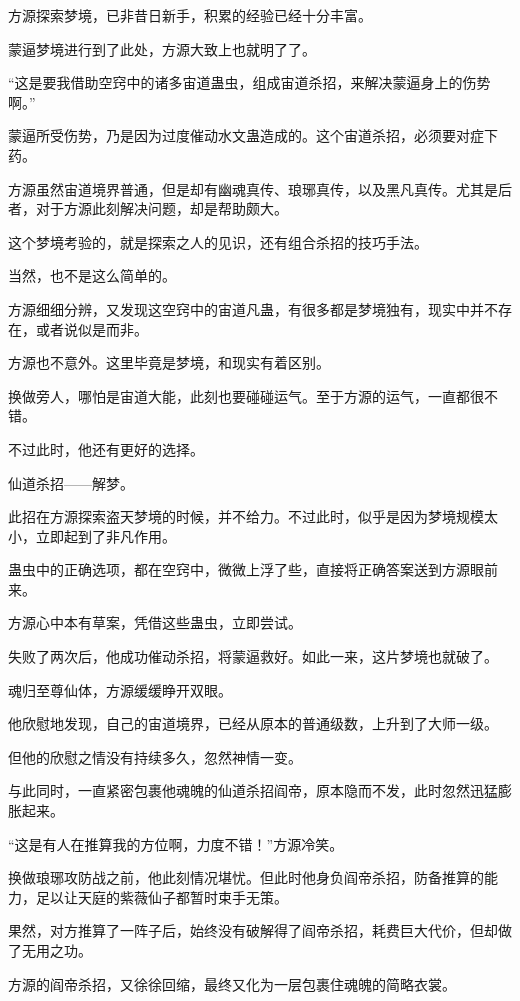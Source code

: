 
\begin{this_body}

方源探索梦境，已非昔日新手，积累的经验已经十分丰富。

蒙逼梦境进行到了此处，方源大致上也就明了了。

“这是要我借助空窍中的诸多宙道蛊虫，组成宙道杀招，来解决蒙逼身上的伤势啊。”

蒙逼所受伤势，乃是因为过度催动水文蛊造成的。这个宙道杀招，必须要对症下药。

方源虽然宙道境界普通，但是却有幽魂真传、琅琊真传，以及黑凡真传。尤其是后者，对于方源此刻解决问题，却是帮助颇大。

这个梦境考验的，就是探索之人的见识，还有组合杀招的技巧手法。

当然，也不是这么简单的。

方源细细分辨，又发现这空窍中的宙道凡蛊，有很多都是梦境独有，现实中并不存在，或者说似是而非。

方源也不意外。这里毕竟是梦境，和现实有着区别。

换做旁人，哪怕是宙道大能，此刻也要碰碰运气。至于方源的运气，一直都很不错。

不过此时，他还有更好的选择。

仙道杀招——解梦。

此招在方源探索盗天梦境的时候，并不给力。不过此时，似乎是因为梦境规模太小，立即起到了非凡作用。

蛊虫中的正确选项，都在空窍中，微微上浮了些，直接将正确答案送到方源眼前来。

方源心中本有草案，凭借这些蛊虫，立即尝试。

失败了两次后，他成功催动杀招，将蒙逼救好。如此一来，这片梦境也就破了。

魂归至尊仙体，方源缓缓睁开双眼。

他欣慰地发现，自己的宙道境界，已经从原本的普通级数，上升到了大师一级。

但他的欣慰之情没有持续多久，忽然神情一变。

与此同时，一直紧密包裹他魂魄的仙道杀招阎帝，原本隐而不发，此时忽然迅猛膨胀起来。

“这是有人在推算我的方位啊，力度不错！”方源冷笑。

换做琅琊攻防战之前，他此刻情况堪忧。但此时他身负阎帝杀招，防备推算的能力，足以让天庭的紫薇仙子都暂时束手无策。

果然，对方推算了一阵子后，始终没有破解得了阎帝杀招，耗费巨大代价，但却做了无用之功。

方源的阎帝杀招，又徐徐回缩，最终又化为一层包裹住魂魄的简略衣裳。


\end{this_body}

